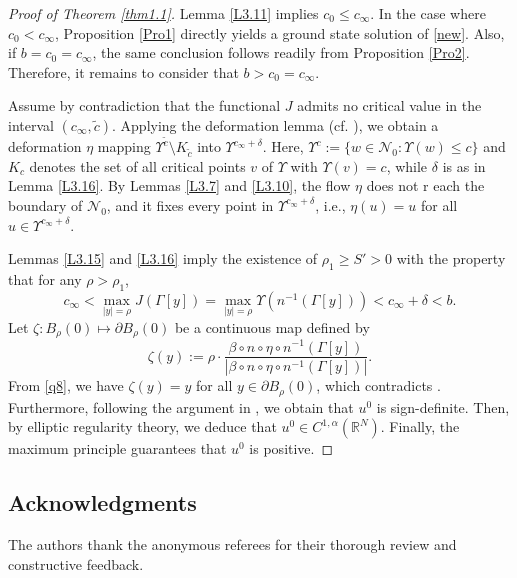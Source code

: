 \documentclass[reqno]{amsart}
\begin{document}
\begin{proof}[Proof of Theorem \ref{thm1.1}]
 Lemma \ref{L3.11} implies \(c_0 \leq c_\infty\). In the case where \(c_0 < c_\infty\), Proposition \ref{Pro1} directly yields a ground state solution of \eqref{new}. 
 Also, if  $b = c_0 = c_\infty$, the same conclusion follows  readily from Proposition \ref{Pro2}. Therefore, it remains to consider that $b>c_0=c_\infty$.

Assume by contradiction that the functional $J$  admits no critical value in the interval 
$(c_\infty ,\tilde{c})$.  Applying the deformation lemma (cf. \cite[p.86]{Struwe}), 
we obtain a deformation \(\eta\) mapping 
\(\Upsilon^{\tilde{c}} \setminus K_{\tilde{c}}\) into \(\Upsilon^{c_\infty + \delta}\). 
Here, \(\Upsilon^{c} := \{ w \in \mathcal{N}_0 : \Upsilon(w) \leq c \}\) and \(K_c\) denotes 
the set of all critical points $v$ of \(\Upsilon\) with \(\Upsilon(v)=c\), while \(\delta\) 
is as in Lemma \ref{L3.16}.  By Lemmas \ref{L3.7} and \ref{L3.10}, the flow \(\eta\) does not r
each the boundary of \(\mathcal{N}_0\), and it fixes every point in 
\(\Upsilon^{c_\infty + \delta}\), i.e., \(\eta(u) = u\) for all \(u \in \Upsilon^{c_\infty + \delta}\).

Lemmas \ref{L3.15} and \ref{L3.16} imply the existence of \(\rho_1 \geq S' > 0\) with the 
property that for any \(\rho > \rho_1\),
$$
c_\infty<\max_{|y|=\rho}J(\Gamma[y])=\max_{|y|=\rho}\Upsilon(n^{-1}(\Gamma[y]))<c_\infty+\delta<b.
$$
Let $\zeta: B_\rho(0)\mapsto \partial B_\rho(0)$ be a continuous map defined by
$$
\zeta(y):=\rho\cdot\frac{\beta\circ n\circ \eta \circ n^{-1}(\Gamma[y])}{|\beta\circ n\circ \eta \circ n^{-1}(\Gamma[y])|}.
$$ 
From \eqref{q8}, we have $\zeta(y)=y$ for all $y\in\partial B_\rho(0)$, which contradicts 
 \cite[D.11]{Willem}. Furthermore, following the argument in 
 \cite[Lemma 2.4]{Clapp}, we obtain that $u^0$  is sign-definite.  
 Then, by elliptic regularity theory, we deduce that $u^0\in C^{1,\alpha}({\mathbb{R}^N})$. 
 Finally, the maximum principle guarantees that  $u^0$ is positive. 
 \end{proof}

\subsection*{Acknowledgments}
The authors thank the  anonymous referees for  their thorough review and constructive feedback. 
\end{document}
